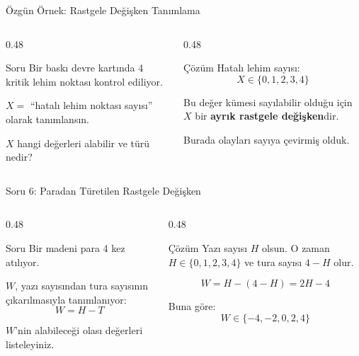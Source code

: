 \documentclass[light]{lutbeamer}
\begin{document}
\begin{frame}{Özgün Örnek: Rastgele Değişken Tanımlama}
\small
\begin{columns}[T,onlytextwidth]
    \begin{column}{0.48\textwidth}
        \begin{block}{Soru}
            Bir baskı devre kartında 4 kritik lehim noktası kontrol ediliyor.

            \vspace{0.15cm}
            $X=$ ``hatalı lehim noktası sayısı'' olarak tanımlansın.

            \vspace{0.15cm}
            $X$ hangi değerleri alabilir ve türü nedir?
        \end{block}
    \end{column}
    \begin{column}{0.48\textwidth}
        \begin{exampleblock}{Çözüm}
            Hatalı lehim sayısı:
            \[
            X \in \{0,1,2,3,4\}
            \]

            Bu değer kümesi sayılabilir olduğu için $X$ bir \textbf{ayrık rastgele değişken}dir.

            \vspace{0.15cm}
            Burada olayları sayıya çevirmiş olduk.
        \end{exampleblock}
    \end{column}
\end{columns}
\end{frame}

\begin{frame}{Soru 6: Paradan Türetilen Rastgele Değişken}
\scriptsize
\begin{columns}[T,onlytextwidth]
    \begin{column}{0.48\textwidth}
        \begin{block}{Soru}
            Bir madeni para 4 kez atılıyor.

            \vspace{0.15cm}
            $W$, yazı sayısından tura sayısının çıkarılmasıyla tanımlanıyor:
            \[
            W = H - T
            \]

            $W$'nin alabileceği olası değerleri listeleyiniz.
        \end{block}
    \end{column}
    \begin{column}{0.48\textwidth}
        \begin{exampleblock}{Çözüm}
            Yazı sayısı $H$ olsun. O zaman $H \in \{0,1,2,3,4\}$ ve tura sayısı $4-H$ olur.

            \[
            W = H-(4-H)=2H-4
            \]

            Buna göre:
            \[
            W \in \{-4,-2,0,2,4\}
            \]
        \end{exampleblock}
    \end{column}
\end{columns}
\end{frame}
\end{document}
